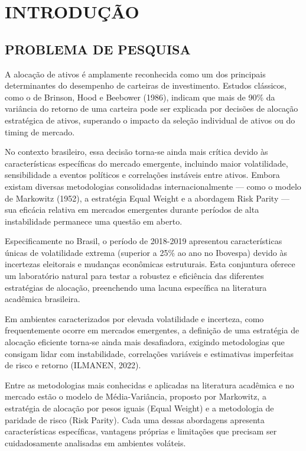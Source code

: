 
\chapter{INTRODUÇÃO}

\section{PROBLEMA DE PESQUISA}

A alocação de ativos é amplamente reconhecida como um dos principais determinantes do desempenho de carteiras de investimento. Estudos clássicos, como o de Brinson, Hood e Beebower (1986), indicam que mais de 90\% da variância do retorno de uma carteira pode ser explicada por decisões de alocação estratégica de ativos, superando o impacto da seleção individual de ativos ou do timing de mercado.

No contexto brasileiro, essa decisão torna-se ainda mais crítica devido às características específicas do mercado emergente, incluindo maior volatilidade, sensibilidade a eventos políticos e correlações instáveis entre ativos. Embora existam diversas metodologias consolidadas internacionalmente --- como o modelo de Markowitz (1952), a estratégia Equal Weight e a abordagem Risk Parity --- sua eficácia relativa em mercados emergentes durante períodos de alta instabilidade permanece uma questão em aberto.

Especificamente no Brasil, o período de 2018-2019 apresentou características únicas de volatilidade extrema (superior a 25\% ao ano no Ibovespa) devido às incertezas eleitorais e mudanças econômicas estruturais. Esta conjuntura oferece um laboratório natural para testar a robustez e eficiência das diferentes estratégias de alocação, preenchendo uma lacuna específica na literatura acadêmica brasileira.

Em ambientes caracterizados por elevada volatilidade e incerteza, como frequentemente ocorre em mercados emergentes, a definição de uma estratégia de alocação eficiente torna-se ainda mais desafiadora, exigindo metodologias que consigam lidar com instabilidade, correlações variáveis e estimativas imperfeitas de risco e retorno (ILMANEN, 2022).

Entre as metodologias mais conhecidas e aplicadas na literatura acadêmica e no mercado estão o modelo de Média-Variância, proposto por Markowitz, a estratégia de alocação por pesos iguais (Equal Weight) e a metodologia de paridade de risco (Risk Parity). Cada uma dessas abordagens apresenta características específicas, vantagens próprias e limitações que precisam ser cuidadosamente analisadas em ambientes voláteis.

